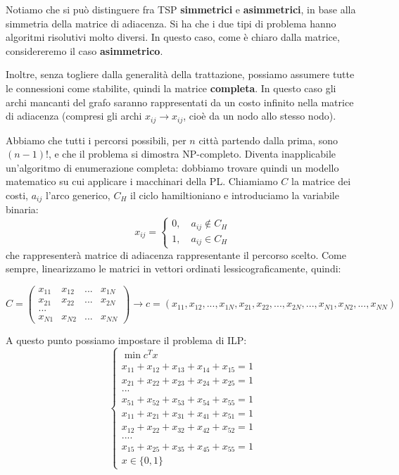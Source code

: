 \documentclass[a4paper,11pt]{article}
\begin{document}
Notiamo che si può distinguere fra TSP \textbf{simmetrici} e \textbf{asimmetrici}, in base alla simmetria della matrice di adiacenza.
Si ha che i due tipi di problema hanno algoritmi risolutivi molto diversi.
In questo caso, come è chiaro dalla matrice, considereremo il caso \textbf{asimmetrico}.

Inoltre, senza togliere dalla generalità della trattazione, possiamo assumere tutte le connessioni come stabilite, quindi la matrice \textbf{completa}. In questo caso gli archi mancanti del grafo saranno rappresentati da un costo infinito nella matrice di adiacenza (compresi gli archi $x_{ij} \rightarrow x_{ij}$, cioè da un nodo allo stesso nodo).

Abbiamo che tutti i percorsi possibili, per $n$ città partendo dalla prima, sono $(n-1)!$, e che il problema si dimostra NP-completo. 
Diventa inapplicabile un'algoritmo di enumerazione completa: dobbiamo trovare quindi un modello matematico su cui applicare i macchinari della PL.
Chiamiamo $C$ la matrice dei costi, $a_{ij}$ l'arco generico, $C_H$ il ciclo hamiltioniano e introduciamo la variabile binaria:
$$
x_{ij} =
	\begin{cases}
		0, \quad a_{ij} \notin C_H \\
		1, \quad a_{ij} \in C_H
	\end{cases}
$$
che rappresenterà matrice di adiacenza rappresentante il percorso scelto.
Come sempre, linearizzamo le matrici in vettori ordinati lessicograficamente, quindi:

$$ C = \begin{pmatrix}
	x_{11} & x_{12} & ... & x_{1N} \\ 
	x_{21} & x_{22} & ... & x_{2N} \\ 
	... \\ 
	x_{N1} & x_{N2} & ... & x_{NN}
\end{pmatrix} \rightarrow c = (x_{11}, x_{12}, ..., x_{1N}, x_{21}, x_{22}, ..., x_{2N}, ..., x_{N1}, x_{N2}, ..., x_{NN}) $$

A questo punto possiamo impostare il problema di ILP:
\[
	\begin{cases}
		\min c^T x \\ 
		x_{11} + x_{12} + x_{13} + x_{14} + x_{15} = 1 \\ 
		x_{21} + x_{22} + x_{23} + x_{24} + x_{25} = 1 \\ 
		... \\ 
		x_{51} + x_{52} + x_{53} + x_{54} + x_{55} = 1 \\ 
		x_{11} + x_{21} + x_{31} + x_{41} + x_{51} = 1 \\ 
		x_{12} + x_{22} + x_{32} + x_{42} + x_{52} = 1 \\ 
		.... \\
		x_{15} + x_{25} + x_{35} + x_{45} + x_{55} = 1 \\ 
		x \in \{ 0, 1 \}
	\end{cases}
\]
\end{document}
